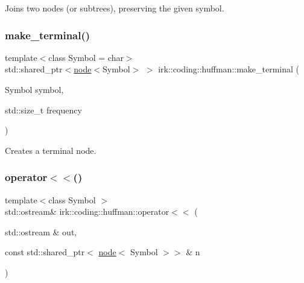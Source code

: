 Joins two nodes (or subtrees), preserving the given symbol. 

\mbox{\label{namespaceirk_1_1coding_1_1huffman_a02736685ec8f32576af06336b2ec9ed8}} 
\subsubsection{\texorpdfstring{make\+\_\+terminal()}{make\_terminal()}}
{\footnotesize\ttfamily template$<$class Symbol  = char$>$ \\
std\+::shared\+\_\+ptr$<$\mbox{\hyperlink{structirk_1_1coding_1_1huffman_1_1node}{node}}$<$Symbol$>$ $>$ irk\+::coding\+::huffman\+::make\+\_\+terminal (\begin{DoxyParamCaption}\item[{Symbol}]{symbol,  }\item[{std\+::size\+\_\+t}]{frequency }\end{DoxyParamCaption})}



Creates a terminal node. 

\mbox{\label{namespaceirk_1_1coding_1_1huffman_a84ac96d5053bc449a2a6b1b8a66aa9da}} 
\subsubsection{\texorpdfstring{operator$<$$<$()}{operator<<()}}
{\footnotesize\ttfamily template$<$class Symbol $>$ \\
std\+::ostream\& irk\+::coding\+::huffman\+::operator$<$$<$ (\begin{DoxyParamCaption}\item[{std\+::ostream \&}]{out,  }\item[{const std\+::shared\+\_\+ptr$<$ \mbox{\hyperlink{structirk_1_1coding_1_1huffman_1_1node}{node}}$<$ Symbol $>$$>$ \&}]{n }\end{DoxyParamCaption})}

\mbox{\label{namespaceirk_1_1coding_1_1huffman_a63e61bc94c39b2400e4cf422db2ececf}} 
